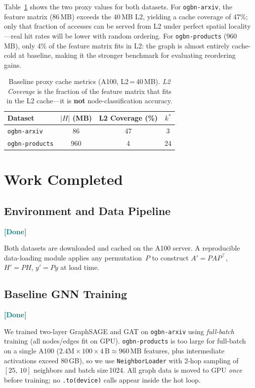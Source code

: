 \documentclass[sigconf,review]{acmart}
\newcommand{\done}{\textcolor{teal}{\textbf{[Done]}}}
\begin{document}
Table~\ref{tab:proxy} shows the two proxy values for both datasets.
For \texttt{ogbn-arxiv}, the feature matrix (86\,MB) exceeds the 40\,MB L2,
yielding a cache coverage of 47\%; only that fraction of accesses
can be served from L2 under perfect spatial locality---real hit rates
will be lower with random ordering.
For \texttt{ogbn-products} (960\,MB), only 4\% of the feature matrix
fits in L2: the graph is almost entirely cache-cold at baseline,
making it the stronger benchmark for evaluating reordering gains.

\begin{table}[h]
\centering
\caption{Baseline proxy cache metrics (A100, L2\,=\,40\,MB).
\emph{L2 Coverage} is the fraction of the feature matrix that fits in the
L2 cache---it is \textbf{not} node-classification accuracy.}
\label{tab:proxy}
\begin{tabular}{lccc}
\toprule
\textbf{Dataset} & \textbf{$|H|$ (MB)} & \textbf{L2 Coverage (\%)} & \textbf{$k^*$} \\
\midrule
\texttt{ogbn-arxiv}    &  86 & 47 &  3 \\
\texttt{ogbn-products} & 960 &  4 & 24 \\
\bottomrule
\end{tabular}
\end{table}

\section{Work Completed}

\subsection{Environment and Data Pipeline} \done

Both datasets are downloaded and cached on the A100 server.
A reproducible data-loading module applies any permutation~$P$ to construct
$A'\!=\!PAP^\top$, $H'\!=\!PH$, $y'\!=\!Py$ at load time.

\subsection{Baseline GNN Training} \done

We trained two-layer GraphSAGE and GAT on \texttt{ogbn-arxiv} using
\emph{full-batch} training (all nodes/edges fit on GPU).
\texttt{ogbn-products} is too large for full-batch on a single A100
($2.4\text{M}\times100\times4\,\text{B}\approx960\,\text{MB}$ features, plus
intermediate activations exceed 80\,GB), so we use
\texttt{NeighborLoader} with 2-hop sampling of
$[25,\,10]$ neighbors and batch size\,1024.
All graph data is moved to GPU \emph{once} before training;
no \texttt{.to(device)} calls appear inside the hot loop.
\end{document}
